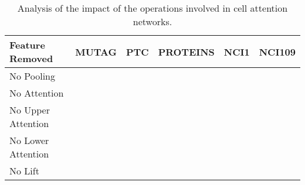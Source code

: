 \documentclass{article}
\begin{document}
\begin{table}[t]
\centering
\caption{Analysis of the impact of the operations involved in cell attention networks.}
\label{tab:ablation}
\begin{tabular}{lccccc}
\toprule
\multicolumn{1}{l}{Feature Removed}  & \multicolumn{1}{c}{MUTAG} & \multicolumn{1}{c}{PTC} & \multicolumn{1}{c}{PROTEINS} & \multicolumn{1}{c}{NCI1} & \multicolumn{1}{c}{NCI109} \\
\bottomrule 
No Pooling                   & \multicolumn{1}{c}{} & \multicolumn{1}{c}{} & \multicolumn{1}{c}{} & \multicolumn{1}{c}{} & \multicolumn{1}{c}{} \\
No Attention            & \multicolumn{1}{c}{} & \multicolumn{1}{c}{} & \multicolumn{1}{c}{ } & \multicolumn{1}{c}{} & \multicolumn{1}{c}{} \\
No Upper Attention                    & \multicolumn{1}{c}{} & \multicolumn{1}{c}{} & \multicolumn{1}{c}{} & \multicolumn{1}{c}{} & \multicolumn{1}{c}{}\\
No Lower Attention           & \multicolumn{1}{c}{} & \multicolumn{1}{c}{} & \multicolumn{1}{c}{} & \multicolumn{1}{c}{} & \multicolumn{1}{c}{} \\
No Lift             & \multicolumn{1}{c}{} & \multicolumn{1}{c}{} & \multicolumn{1}{c}{} & \multicolumn{1}{c}{
} & \multicolumn{1}{c}{} \\
\bottomrule
\end{tabular}
\end{table}
\end{document}
